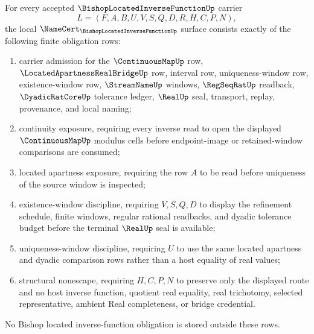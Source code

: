 
\begin{theorem}\label{thm:bishops-located-inverse-function-namecert-obligations}
For every accepted $\BishopLocatedInverseFunctionUp$ carrier
$$
L=(F,A,B,U,V,S,Q,D,R,H,C,P,N),
$$
the local $\NameCert_{\BishopLocatedInverseFunctionUp}$ surface consists exactly of the following finite obligation rows:
\begin{enumerate}
\item carrier admission for the $\ContinuousMapUp$ row, $\LocatedApartnessRealBridgeUp$ row, interval row, uniqueness-window row, existence-window row, $\StreamNameUp$ windows, $\RegSeqRatUp$ readback, $\DyadicRatCoreUp$ tolerance ledger, $\RealUp$ seal, transport, replay, provenance, and local naming;
\item continuity exposure, requiring every inverse read to open the displayed $\ContinuousMapUp$ modulus cells before endpoint-image or retained-window comparisons are consumed;
\item located apartness exposure, requiring the row $A$ to be read before uniqueness of the source window is inspected;
\item existence-window discipline, requiring $V,S,Q,D$ to display the refinement schedule, finite windows, regular rational readbacks, and dyadic tolerance budget before the terminal $\RealUp$ seal is available;
\item uniqueness-window discipline, requiring $U$ to use the same located apartness and dyadic comparison rows rather than a host equality of real values;
\item structural nonescape, requiring $H,C,P,N$ to preserve only the displayed route and no host inverse function, quotient real equality, real trichotomy, selected representative, ambient Real completeness, or bridge credential.
\end{enumerate}
No Bishop located inverse-function obligation is stored outside these rows.
\end{theorem}

